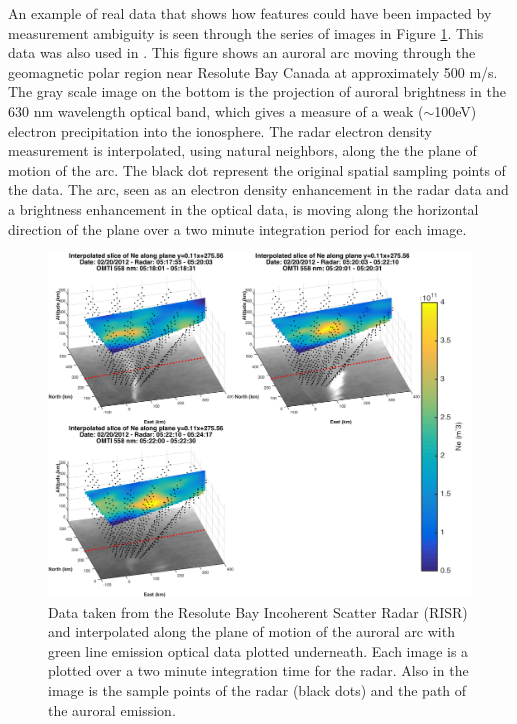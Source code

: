An example of real data that shows how features could have been impacted by measurement ambiguity is seen through the series of images in Figure \ref{fig:realdataplane3points}. This data was also used in \citet{Perry:2015jf}. This figure shows an auroral arc moving through the geomagnetic polar region near Resolute Bay Canada at approximately 500 m/s. The gray scale image on the bottom is the projection of auroral brightness in the 630 nm wavelength optical band, which gives a measure of a weak ($\sim$100eV) electron precipitation into the ionosphere. The radar electron density measurement is interpolated, using natural neighbors, along the the plane of motion of the arc. The black dot represent the original spatial sampling points of the data. The arc, seen as an electron density enhancement in the radar data and a brightness enhancement in the optical data, is moving along the horizontal direction of the plane over a two minute integration period for each image. 

\begin{figure}[htb]
	\centering
	\includegraphics[width=5in]{radarwithoptical}
	\caption{Data taken from the Resolute Bay Incoherent Scatter Radar (RISR) and interpolated along the plane of motion of the auroral arc with green line emission optical data plotted underneath. Each image is a plotted over a two minute integration time for the radar. Also in the image is the sample points of the radar (black dots) and the path of the auroral emission. }
	\label{fig:realdataplane3points}
\end{figure}

